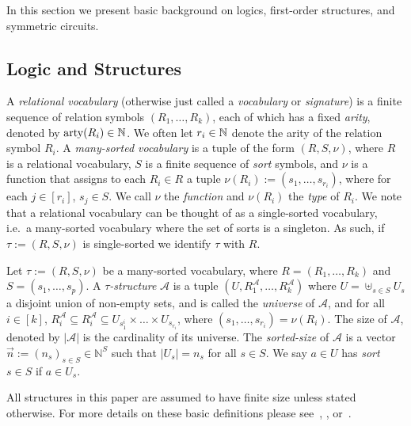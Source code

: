 \documentclass[../paper.tex]{subfiles}
\begin{document}
In this section we present basic background on logics, first-order structures,
and symmetric circuits.

\subsection{Logic and Structures}
A \emph{relational vocabulary} (otherwise just called a \emph{vocabulary} or
\emph{signature}) is a finite sequence of relation symbols $(R_1, \ldots, R_k)$,
each of which has a fixed \emph{arity}, denoted by $\mathrm{arty}(R_i) \in \mathbb{N}$. We
often let $r_i \in \mathbb{N}$ denote the arity of the relation symbol $R_i$. A
\emph{many-sorted vocabulary} is a tuple of the form $(R, S, \nu)$, where $R$ is
a relational vocabulary, $S$ is a finite sequence of \emph{sort} symbols, and $\nu$ is a function that assigns to each $R_i \in R$ a tuple
$\nu(R_i) := (s_1, \ldots, s_{r_i})$, where for each $j \in [r_i]$, $s_j
\in S$.  We call $\nu$ the \emph{\type function} and $\nu(R_i)$ the \emph{type}
of $R_i$.  We note that a relational vocabulary can be thought of as a
single-sorted vocabulary, i.e.\ a many-sorted vocabulary where the set of sorts
is a singleton. As such, if $\tau := (R, S, \nu)$ is single-sorted we identify
$\tau$ with $R$.

Let $\tau := (R, S, \nu)$ be a many-sorted vocabulary, where $R = (R_1, \ldots,
R_k)$ and $S = (s_1, \ldots , s_p)$.  A \emph{$\tau$-structure} $\mathcal{A}$ is a
tuple $(U , R^{\mathcal{A}}_1 , \ldots , R^{\mathcal{A}}_k)$ where $U =
\uplus_{s \in S } U_{s}$ a disjoint union of non-empty sets, and is called the
\emph{universe} of $\mathcal{A}$, and for all $i \in [k]$, $R^{\mathcal{A}}_i
\subseteq R^{\mathcal{A}}_i \subseteq U_{s^i_1} \times \ldots \times
U_{s_{r_i}}$, where $(s_1 , \ldots , s_{r_i}) = \nu (R_i)$. The size of
$\mathcal{A}$, denoted by $\vert \mathcal{A} \vert$ is the cardinality of its
universe.  The \emph{sorted-size} of $\mathcal{A}$ is a vector $\vec{n} :=
(n_{s})_{s \in S} \in \mathbb{N}^{S}$ such that $\vert U_{s} \vert =
n_{s}$ for all $s \in S$. We say $a \in U$ has \emph{sort} $s \in S$ if $a
\in U_s$.

All structures in this paper are assumed to have finite size unless stated
otherwise. For more details on these basic definitions please
see~\cite{Gradel:2005}, \cite{immerman1999descriptive},
or~\cite{grohe2017descriptive}.

\end{document}
